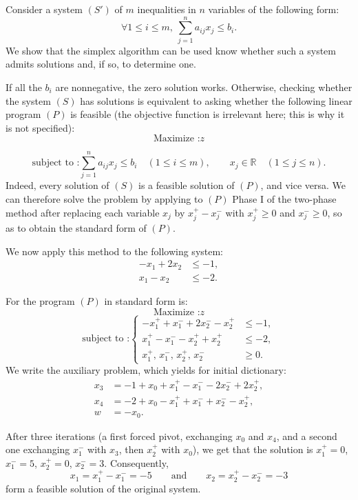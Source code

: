 \begin{example}
    Consider a system \((S')\) of \(m\) inequalities in \(n\) variables of the following form:
    \[
    \forall 1 \le i \le m,\ \sum_{j=1}^n a_{ij} x_j \leqslant b_i.
    \]
    We show that the simplex algorithm can be used know whether such a system admits solutions and, if so, to determine one.

    If all the $b_i$ are nonnegative, the zero solution works. Otherwise, checking whether the system $(S)$ has solutions is equivalent to asking whether the following linear program $(P)$ is feasible (the objective function is irrelevant here; this is why it is not specified):
    \[
    \text{Maximize :} z
    \]

    \[
    \text{subject to :} \sum_{j=1}^{n} a_{ij} x_j \le b_i \quad (1 \le i \le m), \qquad x_j \in \mathbb{R} \quad (1 \le j \le n).
    \]
    Indeed, every solution of $(S)$ is a feasible solution of $(P)$, and vice versa. We can therefore solve the problem by applying to $(P)$ Phase I of the two-phase method after replacing each variable $x_j$ by $x_j^{+}-x_j^{-}$ with $x_j^{+}\ge 0$ and $x_j^{-}\ge 0$, so as to obtain the standard form of $(P)$.

    We now apply this method to the following system:
    \[
    \begin{aligned}
        -x_1 + 2x_2 &\le -1,\\
        x_1 - x_2 &\le -2.
    \end{aligned}
    \]

    For the program $(P)$ in standard form is:
    \[
        \text{Maximize :} z
    \]
    \[
        \text{subject to :}
        \left\{
        \begin{aligned}
            -x_1^{+} + x_1^{-} + 2x_2^{-} - x_2^{+} &\leqslant -1,\\
            x_1^{+} - x_1^{-} - x_2^{+} + x_2^{+} &\leqslant -2,\\
            x_1^{+},\,x_1^{-},\,x_2^{+},\,x_2^{-} &\geqslant 0.
        \end{aligned}
        \right.
    \]
    We write the auxiliary problem, which yields for initial dictionary:
    \begin{align*}
        x_3 &= -1 + x_0 + x_1^{+} - x_1^{-} - 2x_2^{-} + 2x_2^{+},\\
        x_4 &= -2 + x_0 - x_1^{+} + x_1^{-} + x_2^{-} - x_2^{+},\\
        \hline
        w   &= -x_0.
    \end{align*}

    After three iterations (a first forced pivot, exchanging $x_0$ and $x_4$, and a second one exchanging $x_1^{-}$ with $x_3$, then $x_2^{+}$ with $x_0$), we get that the solution is $x_1^{+}=0$, $x_1^{-}=5$, $x_2^{+}=0$, $x_2^{-}=3$. Consequently,
    \[
    x_1 = x_1^{+} - x_1^{-} = -5
    \qquad\text{and}\qquad
    x_2 = x_2^{+} - x_2^{-} = -3
    \]
    form a feasible solution of the original system.
\end{example}